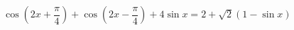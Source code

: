 \begin{ex}[type=equation]
	\begin{condition}
		$\ \cos{\left(2x + \dfrac{\pi}{4}\right)} + \cos{\left(2x -\dfrac{\pi}{4}\right)} + 4\sin x = 2 +\sqrt{2}(1 -\sin x)$
	\end{condition}
\end{ex}